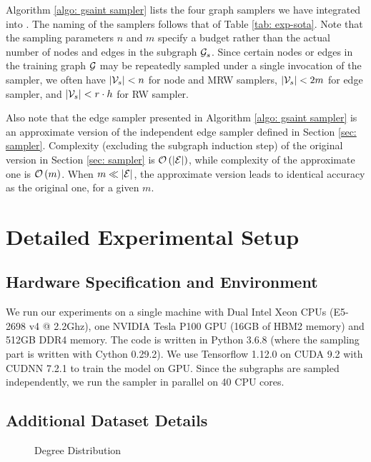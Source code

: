 Algorithm \ref{algo: gsaint sampler} lists the four graph samplers we have integrated into {\graphsaint}. The naming of the samplers follows that of Table \ref{tab: exp-sota}. 
Note that the sampling parameters $n$ and $m$ specify a budget rather than the actual number of nodes and edges in the subgraph $\G[s]$. 
Since certain nodes or edges in the training graph $\G$ may be repeatedly sampled under a single invocation of the sampler, we often have $\size{\V[s]}<n$ for node and MRW samplers, $\size{\V[s]}<2m$ for edge sampler, and $\size{\V[s]}<r\cdot h$ for RW sampler. 

Also note that the edge sampler presented in Algorithm \ref{algo: gsaint sampler} is an approximate version of the independent edge sampler defined in Section \ref{sec: sampler}. 
Complexity (excluding the subgraph induction step) of the original version in Section \ref{sec: sampler} is $\mathcal{O}\paren{\size{\E}}$, while  complexity of the approximate one is $\mathcal{O}\left( m \right)$. 
When $m\ll \size{\E}$, the approximate version leads to identical accuracy as the original one, for a given $m$. 

\section{Detailed Experimental Setup}

\subsection{Hardware Specification and Environment}
\label{appendix: hw}

We run our experiments on a single machine with Dual Intel Xeon CPUs (E5-2698 v4 @ 2.2Ghz), one NVIDIA Tesla P100 GPU (16GB of HBM2 memory) and 512GB DDR4 memory. The code is written in Python 3.6.8 (where the sampling part is written with Cython 0.29.2). We use Tensorflow 1.12.0 on CUDA 9.2 with CUDNN 7.2.1 to train the model on GPU. Since the subgraphs are sampled independently, we run the sampler in parallel on 40 CPU cores. 

\subsection{Additional Dataset Details}
\label{appendix: data}

\begin{figure}
    \centering
    
    \caption{Degree Distribution}
    \label{fig:deg}
\end{figure}


